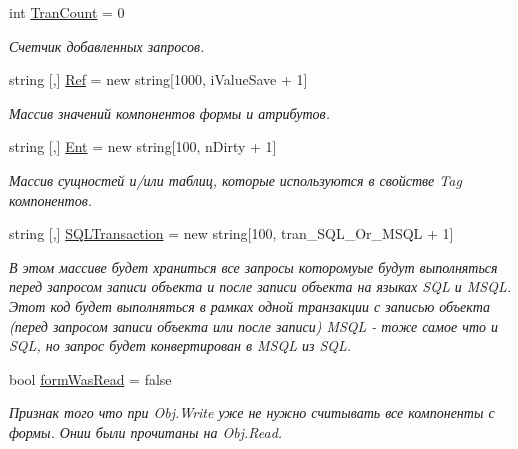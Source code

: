 \begin{DoxyCompactItemize}
int \mbox{\hyperlink{class_f_b_a_1_1_object_ref_a216c7fe78cd63288b35516e33fa1013f}{Tran\+Count}} = 0
\begin{DoxyCompactList}\small\item\em Счетчик добавленных запросов. \end{DoxyCompactList}\item 
string \mbox{[},\mbox{]} \mbox{\hyperlink{class_f_b_a_1_1_object_ref_a7d512d347fad3d41e9a5c60ff8dd722b}{Ref}} = new string\mbox{[}1000, i\+Value\+Save + 1\mbox{]}
\begin{DoxyCompactList}\small\item\em Массив значений компонентов формы и атрибутов. \end{DoxyCompactList}\item 
string \mbox{[},\mbox{]} \mbox{\hyperlink{class_f_b_a_1_1_object_ref_a684b661f5ba5955a3a03ffa8964ef16d}{Ent}} = new string\mbox{[}100, n\+Dirty + 1\mbox{]}
\begin{DoxyCompactList}\small\item\em Массив сущностей и/или таблиц, которые используются в свойстве Tag компонентов. \end{DoxyCompactList}\item 
string \mbox{[},\mbox{]} \mbox{\hyperlink{class_f_b_a_1_1_object_ref_aa89efd334f666aba664c8a3363e48b83}{S\+Q\+L\+Transaction}} = new string\mbox{[}100, tran\+\_\+\+S\+Q\+L\+\_\+\+Or\+\_\+\+M\+S\+QL + 1\mbox{]}
\begin{DoxyCompactList}\small\item\em В этом массиве будет храниться все запросы которомуые будут выполняться перед запросом записи объекта и после записи объекта на языках S\+QL и M\+S\+QL. Этот код будет выполняться в рамках одной транзакции с записью объекта (перед запросом записи объекта или после записи) M\+S\+QL -\/ тоже самое что и S\+QL, но запрос будет конвертирован в M\+S\+QL из S\+QL. ~\newline
\end{DoxyCompactList}\item 
bool \mbox{\hyperlink{class_f_b_a_1_1_object_ref_ac7b0d6511b85e206c9560e479f5470f1}{form\+Was\+Read}} = false
\begin{DoxyCompactList}\small\item\em Признак того что при Obj.\+Write уже не нужно считывать все компоненты с формы. Онии были прочитаны на Obj.\+Read. \end{DoxyCompactList}\end{DoxyCompactItemize}
